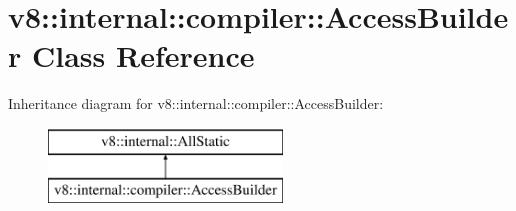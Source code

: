 \hypertarget{classv8_1_1internal_1_1compiler_1_1_access_builder}{}\section{v8\+:\+:internal\+:\+:compiler\+:\+:Access\+Builder Class Reference}
\label{classv8_1_1internal_1_1compiler_1_1_access_builder}
Inheritance diagram for v8\+:\+:internal\+:\+:compiler\+:\+:Access\+Builder\+:\begin{figure}[H]
\begin{center}
\leavevmode
\includegraphics[height=2.000000cm]{classv8_1_1internal_1_1compiler_1_1_access_builder}
\end{center}
\end{figure}
